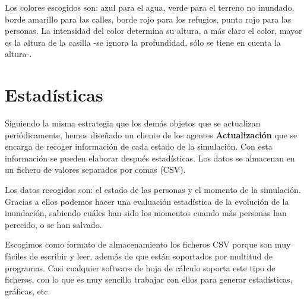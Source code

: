 Los colores escogidos son: azul para el agua, verde para el terreno no
inundado, borde amarillo para las calles, borde rojo para los refugios, punto
rojo para las personas. La intensidad del color determina su altura, a más
claro el color, mayor es la altura de la casilla -se ignora la profundidad,
sólo se tiene en cuenta la altura-.

\section*{Estadísticas}

Siguiendo la misma estrategia que los demás objetos que se actualizan
periódicamente, hemos diseñado un cliente de los agentes {\bf Actualización} que
se encarga de recoger información de cada estado de la simulación. Con esta
información se pueden elaborar después estadísticas. Los datos se almacenan en
un fichero de valores separados por comas (CSV).

Los datos recogidos son: el estado de las personas y el momento de la
simulación. Gracias a ellos podemos hacer una evaluación estadística de la
evolución de la inundación, sabiendo cuáles han sido los momentos cuando más
personas han perecido, o se han salvado.

Escogimos como formato de almacenamiento los ficheros CSV porque son muy fáciles
de escribir y leer, además de que están soportados por multitud de programas.
Casi cualquier software de hoja de cálculo soporta este tipo de ficheros, con
lo que es muy sencillo trabajar con ellos para generar estadísticas, gráficas,
etc.

